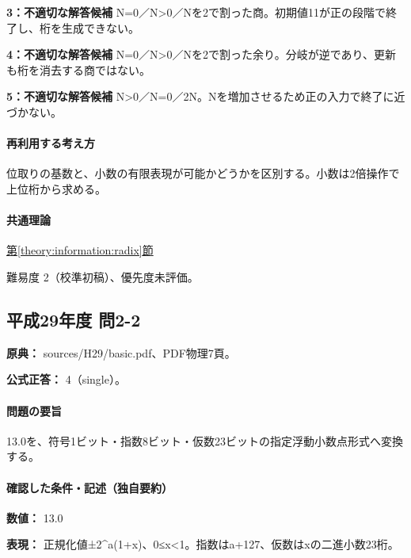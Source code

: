 \noindent\textbf{3：不適切な解答候補} N=\allowbreak{}0／N>0／Nを2で割った商。初期値11が正の段階で終了し、桁を生成できない。\par

\noindent\textbf{4：不適切な解答候補} N=\allowbreak{}0／N>0／Nを2で割った余り。分岐が逆であり、更新も桁を消去する商ではない。\par

\noindent\textbf{5：不適切な解答候補} N>0／N=\allowbreak{}0／2N。Nを増加させるため正の入力で終了に近づかない。\par

\paragraph{再利用する考え方} 位取りの基数と、小数の有限表現が可能かどうかを区別する。小数は2倍操作で上位桁から求める。

\paragraph{共通理論} \hyperref[theory:information:radix]{第\ref*{theory:information:radix}節}

\par 難易度 2（校準初稿）、優先度未評価。

\subsection{平成29年度 問2-2}
\label{q:h29-reg-basic-2-2}

\noindent\textbf{原典：} sources/H29/basic.pdf、PDF物理7頁。

\textbf{公式正答：} 4（single）。

\paragraph{問題の要旨} 13.0を、符号1ビット・指数8ビット・仮数23ビットの指定浮動小数点形式へ変換する。

\paragraph{確認した条件・記述（独自要約）}\mbox{}\par

\noindent\textbf{数値：} 13.0\par

\noindent\textbf{表現：} 正規化値±2\textasciicircum{}a(1+x)、0≤x<1。指数はa+127、仮数はxの二進小数23桁。\par

